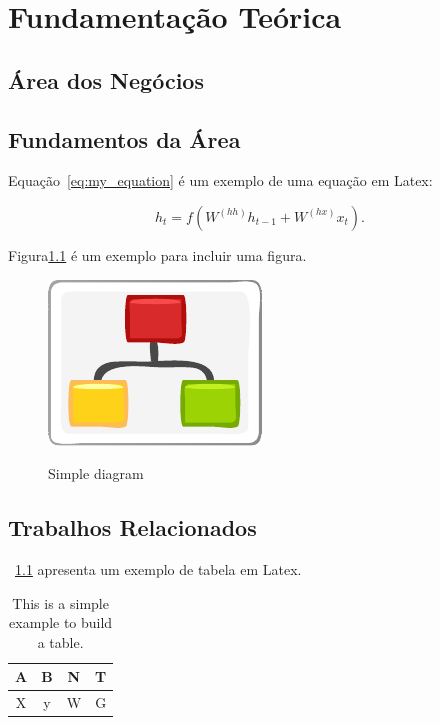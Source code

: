 
\chapter{Fundamentação Teórica}\label{chap:background}


\section{Área dos Negócios}\label{sec:business}


\section{Fundamentos da Área}\label{sec:fundamental}

Equação~\ref{eq:my_equation} é um exemplo de uma equação em Latex:

\begin{equation}\label{eq:my_equation}
    h_t = f(W^{(hh)}h_{t-1} + W^{(hx)}x_t).
\end{equation}


Figura\ref{fig:diagram} é um exemplo para incluir uma figura.

\begin{figure}[htb]
    \caption{Simple diagram}
    \centering
    \includegraphics[scale=1.9]{img/diagram.pdf}
    \label{fig:diagram}
\end{figure}

\cite{GRIEBLER:IJPP:18}


\cite{MACCOOL:structured_patterns:book:12}


\section{Trabalhos Relacionados}\label{sec:rw}


\tablename~\ref{tab:my_table} apresenta um exemplo de tabela em Latex.

\begin{table}[htb]
    \caption{This is a simple example to build a table.}
    \label{tab:my_table}
    \centering
    \begin{tabular}{|c|c|c|c|}
        \hline
         A & B & N & T\\ 
         \hline
         X & y & W & G\\
         \hline
    \end{tabular}
    
\end{table}